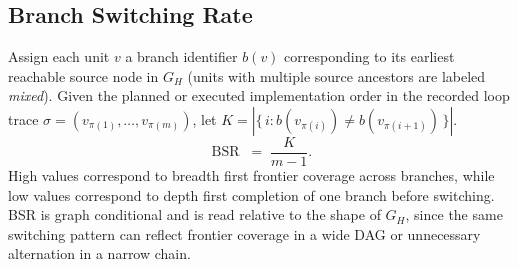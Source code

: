 \subsection{Branch Switching Rate}\label{app:branch-switch}
Assign each unit $v$ a branch identifier $b(v)$ corresponding to its earliest reachable source node in $G_H$ (units with multiple source ancestors are labeled \emph{mixed}). Given the planned or executed implementation order in the recorded loop trace $\sigma = (v_{\pi(1)}, \ldots, v_{\pi(m)})$, let $K = |\{\,i : b(v_{\pi(i)}) \neq b(v_{\pi(i+1)})\,\}|$.
\begin{equation}
\operatorname{BSR} \;=\; \frac{K}{m-1}.
\end{equation}
High values correspond to breadth first frontier coverage across branches, while low values correspond to depth first completion of one branch before switching. BSR is graph conditional and is read relative to the shape of $G_H$, since the same switching pattern can reflect frontier coverage in a wide DAG or unnecessary alternation in a narrow chain.
